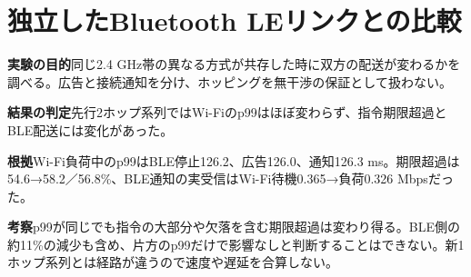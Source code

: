 \documentclass[a4paper,10pt]{ltjsarticle}
\begin{document}
\section{独立したBluetooth LEリンクとの比較}
\par\smallskip\noindent\textbf{実験の目的}\quad 同じ2.4 GHz帯の異なる方式が共存した時に双方の配送が変わるかを調べる。広告と接続通知を分け、ホッピングを無干渉の保証として扱わない。

\par\smallskip\noindent\textbf{結果の判定}\quad 先行2ホップ系列ではWi-Fiのp99はほぼ変わらず、指令期限超過とBLE配送には変化があった。

\noindent\textbf{根拠}\quad Wi-Fi負荷中のp99はBLE停止126.2、広告126.0、通知126.3 ms。期限超過は54.6→58.2／56.8\%、BLE通知の実受信はWi-Fi待機0.365→負荷0.326 Mbpsだった。

\noindent\textbf{考察}\quad p99が同じでも指令の大部分や欠落を含む期限超過は変わり得る。BLE側の約11\%の減少も含め、片方のp99だけで影響なしと判断することはできない。新1ホップ系列とは経路が違うので速度や遅延を合算しない。
\end{document}
